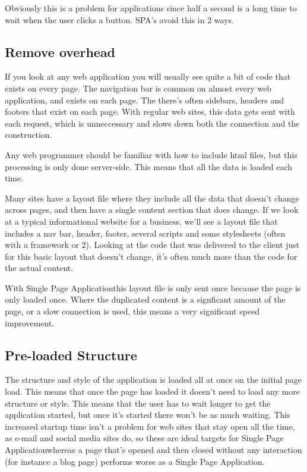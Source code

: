 \documentclass{article}[10pt]
\newcommand{\spa}{Single Page Application}
\begin{document}
Obviously this is a problem for applications since half a second is a long time to wait when the user clicks a button. SPA's avoid this in 2 ways.

\subsection{Remove overhead}

If you look at any web application you will usually see quite a bit of code that exists on every page. The navigation bar is common on almost every web application, and exists on each page. The there's often sidebars, headers and footers that exist on each page. With regular web sites, this data gets sent with each request, which is unneccessary and slows down both the connection and the construction.

Any web programmer should be familiar with how to include html files, but this processing is only done server-side. This means that all the data is loaded each time.

Many sites have a layout file where they include all the data that doesn't change across pages, and then have a single content section that does change. If we look at a typical informational website for a business, we'll see a layout file that includes a nav bar, header, footer, several scripts and some stylesheets (often with a framework or 2). Looking at the code that was delivered to the client just for this basic layout that doesn't change, it's often much more than the code for the actual content.

With \spa this layout file is only sent once because the page is only loaded once. Where the duplicated content is a signficant amount of the page, or a slow connection is used, this means a very significant speed improvement.

\subsection{Pre-loaded Structure}

The structure and style of the application is loaded all at once on the initial page load. This means that once the page has loaded it doesn't need to load any more structure or style. This means that the user has to wait longer to get the application started, but once it's started there won't be as much waiting. This increased startup time isn't a problem for web sites that stay open all the time, as e-mail and social media sites do, so these are ideal targets for \spa  whereas a page that's opened and then closed without any interaction (for instance a blog page) performs worse as a \spa .
\end{document}
